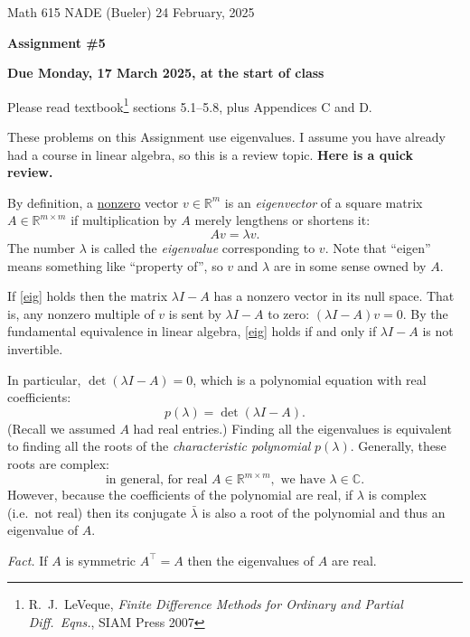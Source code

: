 \documentclass[12pt]{amsart}
\newcommand{\CC}{\mathbb{C}}
\newcommand{\RR}{\mathbb{R}}
\begin{document}
\scriptsize \noindent Math 615 NADE (Bueler) \hfill 24 February, 2025
\normalsize

\medskip\bigskip

\Large\centerline{\textbf{Assignment \#5}}
\large
\bigskip

\centerline{\textbf{Due Monday, 17 March 2025, at the start of class}}
\bigskip
\normalsize

\thispagestyle{empty}

\bigskip
Please read textbook\footnote{R.~J.~LeVeque, \emph{Finite Difference Methods for Ordinary and Partial Diff.~Eqns.}, SIAM Press 2007} sections 5.1–5.8, plus Appendices C and D.

\noindent \hrulefill

These problems on this Assignment use eigenvalues.  I assume you have already had a course in linear algebra, so this is a review topic.  \textbf{Here is a quick review.}

By definition, a \underline{nonzero} vector $v\in \RR^m$ is an \emph{eigenvector} of a square matrix $A \in \RR^{m\times m}$ if multiplication by $A$ merely lengthens or shortens it:
\begin{equation}
    A v = \lambda v.  \label{eig}
\end{equation}
The number $\lambda$ is called the \emph{eigenvalue} corresponding to $v$.  Note that ``eigen'' means something like ``property of'', so $v$ and $\lambda$ are in some sense owned by $A$.

If \eqref{eig} holds then the matrix $\lambda I - A$ has a nonzero vector in its null space.  That is, any nonzero multiple of $v$ is sent by $\lambda I - A$ to zero: $(\lambda I - A) v = 0$.  By the fundamental equivalence in linear algebra, \eqref{eig} holds if and only if $\lambda I - A$ is not invertible.

In particular, $\det(\lambda I - A) = 0$, which is a polynomial equation with real coefficients:
    $$p(\lambda) = \det(\lambda I - A).$$
(Recall we assumed $A$ had real entries.)  Finding all the eigenvalues is equivalent to finding all the roots of the \emph{characteristic polynomial} $p(\lambda)$.  Generally, these roots are complex:
    $$\text{in general, for real } A \in \RR^{m\times m}, \text{ we have } \lambda\in \CC.$$
However, because the coefficients of the polynomial are real, if $\lambda$ is complex (i.e.~not real) then its conjugate $\bar \lambda$ is also a root of the polynomial and thus an eigenvalue of $A$.

\emph{Fact.}  If $A$ is symmetric $A^\top = A$ then the eigenvalues of $A$ are real.
\end{document}
